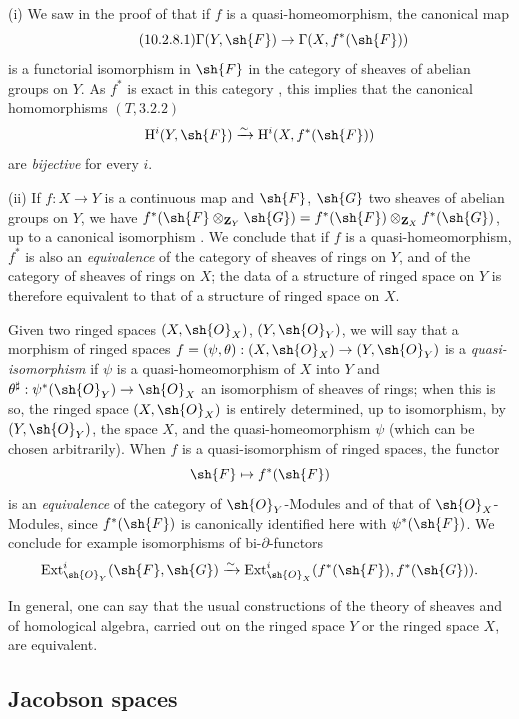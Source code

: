 \begin{remarks}[10.2.8]
\label{IV.10.2.8}
(i) We saw in the proof of  that if $f$ is a quasi-homeomorphism, the canonical map
\begin{equation}
\label{IV.10.2.8.1}
\tag{10.2.8.1}
\Gamma(Y,\sh{F})\to\Gamma(X,f^*(\sh{F}))
\end{equation}
is a functorial isomorphism in $\sh{F}$ in the category of sheaves of abelian groups on $Y$.
As $f^*$ is exact in this category , this implies that the canonical homomorphisms $(T,3.2.2)$
\[
  \mathrm{H}^i(Y,\sh{F})\xrightarrow{\sim}\mathrm{H}^i(X,f^*(\sh{F}))
\]
are \emph{bijective} for every $i$.

(ii) If $f:X\to Y$ is a continuous map and $\sh{F}$, $\sh{G}$ two sheaves of abelian groups on $Y$, we have $f^*(\sh{F}\otimes_{\mathbf{Z}_Y}\sh{G})=f^*(\sh{F})\otimes_{\mathbf{Z}_X}f^*(\sh{G})$, up to a canonical isomorphism .
We conclude that if $f$ is a quasi-homeomorphism, $f^*$ is also an \emph{equivalence} of the category of sheaves of rings on $Y$, and of the category of sheaves of rings on $X$; the data of a structure of ringed space on $Y$ is therefore equivalent to that of a structure of ringed space on $X$.

Given two ringed spaces $(X,\sh{O}_X)$, $(Y,\sh{O}_Y)$, we will say that a morphism of ringed spaces $f=(\psi,\theta):(X,\sh{O}_X)\to(Y,\sh{O}_Y)$ is a \emph{quasi-isomorphism} if $\psi$ is a quasi-homeomorphism of $X$ into $Y$ and $\theta^\sharp:\psi^*(\sh{O}_Y)\to\sh{O}_X$ an isomorphism of sheaves of rings; when this is so, the ringed space $(X,\sh{O}_X)$ is entirely determined, up to isomorphism, by $(Y,\sh{O}_Y)$, the space $X$, and the quasi-homeomorphism $\psi$ (which can be chosen arbitrarily).
When $f$ is a quasi-isomorphism of ringed spaces, the functor
\[
  \sh{F}\mapsto f^*(\sh{F})
\]
is an \emph{equivalence} of the category of $\sh{O}_Y$-Modules and of that of $\sh{O}_X$-Modules, since $f^*(\sh{F})$ is canonically identified here with $\psi^*(\sh{F})$.
We conclude for example isomorphisms of bi-$\partial$-functors
\[
  \operatorname{Ext}^i_{\sh{O}_Y}(\sh{F},\sh{G})\xrightarrow{\sim}\operatorname{Ext}^i_{\sh{O}_X}(f^*(\sh{F}),f^*(\sh{G})).
\]

In general, one can say that the usual constructions of the theory of sheaves and of homological algebra, carried out on the ringed space $Y$ or the ringed space $X$, are equivalent.
\end{remarks}

\subsection{Jacobson spaces}
\label{subsection:IV.10.3}

